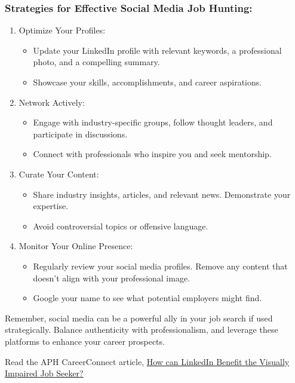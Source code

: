 \subsubsection*{Strategies for Effective Social Media Job Hunting:}
\begin{enumerate}[leftmargin=1cm]
\item Optimize Your Profiles:
\begin{itemize}[leftmargin=1cm]
\item Update your LinkedIn profile with relevant keywords, a professional photo, and a compelling summary.
\item Showcase your skills, accomplishments, and career aspirations.
\end{itemize}
\item Network Actively:
\begin{itemize}[leftmargin=1cm]
   \item Engage with industry-specific groups, follow thought leaders, and participate in discussions.
   \item Connect with professionals who inspire you and seek mentorship.
\end{itemize}
\item Curate Your Content:
\begin{itemize}[leftmargin=1cm]
   \item Share industry insights, articles, and relevant news. Demonstrate your expertise.
   \item Avoid controversial topics or offensive language.
\end{itemize}
\item Monitor Your Online Presence:
\begin{itemize}[leftmargin=1cm]
   \item Regularly review your social media profiles. Remove any content that doesn't align with your professional image.
   \item Google your name to see what potential employers might find.
   \end{itemize}
   \end{enumerate}

Remember, social media can be a powerful ally in your job search if used strategically. Balance authenticity with professionalism, and leverage these platforms to enhance your career prospects. 

Read the APH CareerConnect article, \href{https://aphconnectcenter.org/careerconnect-blog/how-can-linkedin-benefit-the-job-seeker-who-is-blind-or-low-vision/}{How can LinkedIn Benefit the Visually Impaired Job Seeker?}

